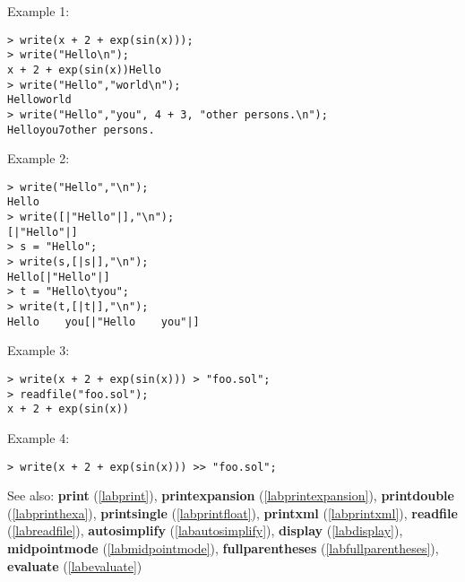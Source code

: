 \noindent Example 1: 
\begin{center}\begin{minipage}{15cm}\begin{Verbatim}[frame=single]
> write(x + 2 + exp(sin(x))); 
> write("Hello\n");
x + 2 + exp(sin(x))Hello
> write("Hello","world\n");
Helloworld
> write("Hello","you", 4 + 3, "other persons.\n");
Helloyou7other persons.
\end{Verbatim}
\end{minipage}\end{center}
\noindent Example 2: 
\begin{center}\begin{minipage}{15cm}\begin{Verbatim}[frame=single]
> write("Hello","\n");
Hello
> write([|"Hello"|],"\n");
[|"Hello"|]
> s = "Hello";
> write(s,[|s|],"\n");
Hello[|"Hello"|]
> t = "Hello\tyou";
> write(t,[|t|],"\n");
Hello    you[|"Hello    you"|]
\end{Verbatim}
\end{minipage}\end{center}
\noindent Example 3: 
\begin{center}\begin{minipage}{15cm}\begin{Verbatim}[frame=single]
> write(x + 2 + exp(sin(x))) > "foo.sol";
> readfile("foo.sol");
x + 2 + exp(sin(x))
\end{Verbatim}
\end{minipage}\end{center}
\noindent Example 4: 
\begin{center}\begin{minipage}{15cm}\begin{Verbatim}[frame=single]
> write(x + 2 + exp(sin(x))) >> "foo.sol";
\end{Verbatim}
\end{minipage}\end{center}
See also: \textbf{print} (\ref{labprint}), \textbf{printexpansion} (\ref{labprintexpansion}), \textbf{printdouble} (\ref{labprinthexa}), \textbf{printsingle} (\ref{labprintfloat}), \textbf{printxml} (\ref{labprintxml}), \textbf{readfile} (\ref{labreadfile}), \textbf{autosimplify} (\ref{labautosimplify}), \textbf{display} (\ref{labdisplay}), \textbf{midpointmode} (\ref{labmidpointmode}), \textbf{fullparentheses} (\ref{labfullparentheses}), \textbf{evaluate} (\ref{labevaluate})
